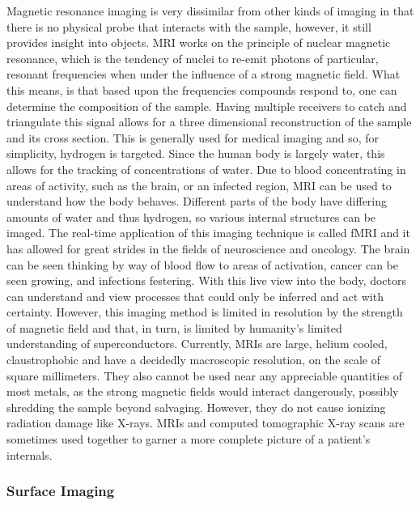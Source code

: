 Magnetic resonance imaging is very dissimilar from other kinds of imaging in that there is no physical probe that interacts with the sample, however, it still provides insight into objects. MRI works on the principle of nuclear magnetic resonance, which is the tendency of nuclei to re-emit photons of particular, resonant frequencies when under the influence of a strong magnetic field. What this means, is that based upon the frequencies compounds respond to, one can determine the composition of the sample. Having multiple receivers to catch and triangulate this signal allows for a three dimensional reconstruction of the sample and its cross section. This is generally used for medical imaging and so, for simplicity, hydrogen is targeted. Since the human body is largely water, this allows for the tracking of concentrations of water. Due to blood concentrating in areas of activity, such as the brain, or an infected region, MRI can be used to understand how the body behaves. Different parts of the body have differing amounts of water and thus hydrogen, so various internal structures can be imaged. The real-time application of this imaging technique is called fMRI and it has allowed for great strides in the fields of neuroscience and oncology. The brain can be seen thinking by way of blood flow to areas of activation, cancer can be seen growing, and infections festering. With this live view into the body, doctors can understand and view processes that could only be inferred and act with certainty. However, this imaging method is limited in resolution by the strength of magnetic field and that, in turn, is limited by humanity's limited understanding of superconductors. Currently, MRIs are large, helium cooled, claustrophobic and have a decidedly macroscopic resolution, on the scale of square millimeters. They also cannot be used near any appreciable quantities of most metals, as the strong magnetic fields would interact dangerously, possibly shredding the sample beyond salvaging. However, they do not cause ionizing radiation damage like X-rays. MRIs and computed tomographic X-ray scans are sometimes used together to garner a more complete picture of a patient's internals.

\subsubsection{Surface Imaging}

